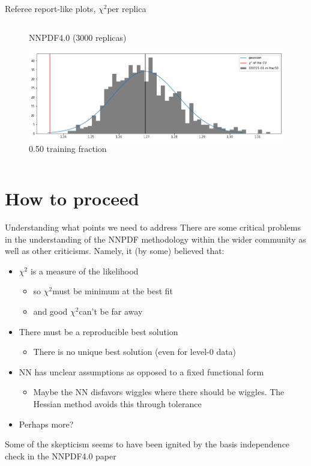 \documentclass[aspectratio=169,10pt]{beamer}
\newcommand{\chitwo}{$\chi^2$}
\begin{document}
\begin{frame}[t]{Referee report-like plots, \chitwo per replica}
\begin{columns}
\begin{column}{0.5\textwidth}
\begin{figure}
        \caption*{\footnotesize  NNPDF4.0 (3000 replicas)}
      \end{figure}
      \vspace*{-0.8cm}
      \begin{figure}
        \includegraphics[height=.3\textheight]{chi2_replicas_0.5trvl.png}
        \caption*{\footnotesize  0.50 training fraction}
      \end{figure}
    \end{column}
  \end{columns}
\end{frame}


\section{How to proceed}

\begin{frame}[t]{Understanding what points we need to address}
  There are some critical problems in the understanding of the NNPDF methodology within the wider community as well as other criticisms. Namely, it (by some) believed that:
  \begin{itemize}
    \item $\chi^2$ is a measure of the likelihood
    \begin{itemize}
      \item so \chitwo must be minimum at the best fit
      \item and good \chitwo can't be far away
    \end{itemize}
    \item There must be a reproducible best solution
    \begin{itemize}
      \item There is no unique best solution (even for level-0 data)
    \end{itemize}
    \item NN has unclear assumptions as opposed to a fixed functional form
    \begin{itemize}
      \item Maybe the NN disfavors wiggles where there should be wiggles. The Hessian method avoids this through tolerance
    \end{itemize}
    \item Perhaps more?
  \end{itemize}
  Some of the skepticism seems to have been ignited by the basis independence check in the NNPDF4.0 paper
\end{frame}
\end{document}
